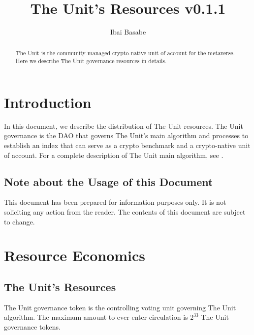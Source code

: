 \documentclass[12pt]{article}
\title{The Unit's Resources v0.1.1}
\author{Ibai Basabe}
\date{}           %
\begin{document}
\pagecolor{white}

\maketitle

\begin{abstract}

The Unit is the community-managed crypto-native unit of account for the metaverse. Here we describe The Unit governance resources in details.

\end{abstract}

\tableofcontents
\newpage



\section{Introduction}

In this document, we describe the distribution of The Unit resources. The Unit governance is the DAO that governs The Unit's main algorithm and processes to establish an index that can serve as a crypto benchmark and a crypto-native unit of account. For a complete description of The Unit main algorithm, see \cite{B1}.

\subsection{Note about the Usage of this Document}

This document has been prepared for information purposes only. It is not soliciting any action from the reader. The contents of this document are subject to change.


\section{Resource Economics}

\subsection{The Unit's Resources}

The Unit governance token is the controlling voting unit governing The Unit algorithm. The maximum amount to ever enter circulation is $2^{33}$ The Unit governance tokens.





\newpage
\end{document}
